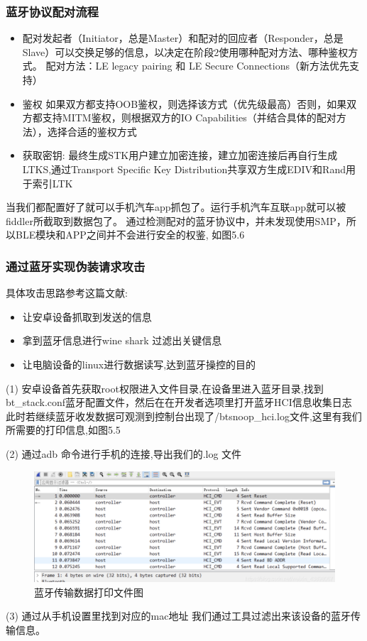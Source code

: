\subsubsection{蓝牙协议配对流程}
\begin{itemize}
    \item 配对发起者（Initiator，总是Master）和配对的回应者（Responder，总是Slave）可以交换足够的信息，以决定在阶段2使用哪种配对方法、哪种鉴权方式。
    配对方法：LE legacy pairing 和 LE Secure Connections（新方法优先支持）
    \item 鉴权 如果双方都支持OOB鉴权，则选择该方式（优先级最高）否则，如果双方都支持MITM鉴权，则根据双方的IO Capabilities（并结合具体的配对方法），选择合适的鉴权方式
    \item 获取密钥: 最终生成STK用户建立加密连接，建立加密连接后再自行生成LTKS,通过Transport Specific Key Distribution共享双方生成EDIV和Rand用于索引LTK
\end{itemize}

当我们都配置好了就可以手机汽车app抓包了。运行手机汽车互联app就可以被fiddler所截取到数据包了。
通过检测配对的蓝牙协议中，并未发现使用SMP，所以BLE模块和APP之间并不会进行安全的权鉴, 如图5.6
\subsubsection{通过蓝牙实现伪装请求攻击}
具体攻击思路参考这篇文献\cite{von2021method}:
\begin{itemize}
    \item 让安卓设备抓取到发送的信息
    \item 拿到蓝牙信息进行wine shark 过滤出关键信息
    \item 让电脑设备的linux进行数据读写,达到蓝牙操控的目的
\end{itemize}

(1) 安卓设备首先获取root权限进入文件目录,在设备里进入蓝牙目录,找到bt\_stack.conf蓝牙配置文件，然后在在开发者选项里打开蓝牙HCI信息收集日志
此时若继续蓝牙收发数据可观测到控制台出现了/btsnoop\_hci.log文件,这里有我们所需要的打印信息,如图5.5

(2) 通过adb 命令进行手机的连接,导出我们的.log 文件
\begin{figure}
    \centering
    \includegraphics[scale=0.5]{resources/img/i17.png}
    \caption{蓝牙传输数据打印文件图}
  \end{figure}
(3) 通过从手机设置里找到对应的mac地址 我们通过工具过滤出来该设备的蓝牙传输信息。
  
